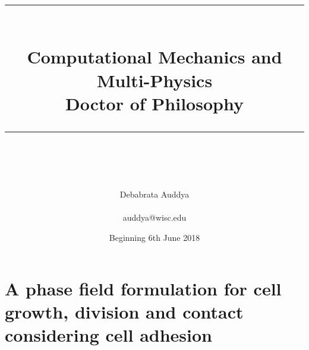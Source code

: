 \documentclass[idxtotoc,hyperref,openany]{labbook} %
\newcommand{\HRule}{\rule{\linewidth}{0.5mm}} %
\begin{document}

\frontmatter %
\title{
\begin{center}
\HRule \\[0.4cm]
{\Huge \bfseries Computational Mechanics and Multi-Physics \\[0.5cm] \Large Doctor of Philosophy}\\[0.4cm] %
\HRule \\[1.5cm]
\end{center}
}
\author{\Huge Debabrata Auddya \\ \\ \LARGE auddya@wisc.edu \\[2cm]} %
\date{Beginning 6th June 2018} %

\maketitle

\tableofcontents

\mainmatter %












\section{A phase field formulation for cell growth, division and contact considering cell adhesion}
\end{document}
